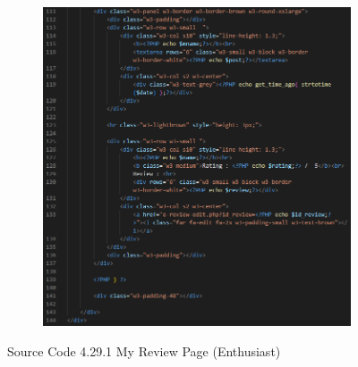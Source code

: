 \begin{enumerate}[1.]
\begin{figure}[h]
\begin{subfigure}[b]{0.7\textwidth}
            \label{fig:sub1}
        \end{subfigure}
        \hspace{0.04\textwidth}
        \begin{subfigure}[b]{0.6\textwidth}
            \centering
            \includegraphics[width=\textwidth]{mainmatter/images/frontend/code/emyreview2.png}
            \label{fig:sub2}
        \end{subfigure}
        \caption*{Source Code 4.29.1 My Review Page (Enthusiast)}
        \label{fig:myfig68a}
    \end{figure}


\end{enumerate}
